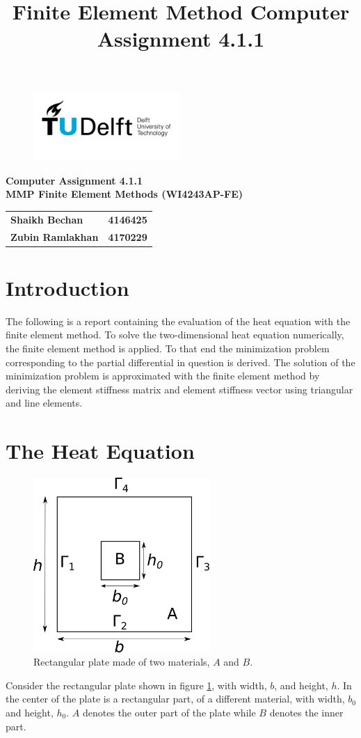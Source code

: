 \documentclass[10pt,a4paper]{article}
\title{Finite Element Method Computer Assignment 4.1.1}
\begin{document}
\begin{figure}[t]
	\centering
	\includegraphics[width=0.5\textwidth]{TU_d_line_P1_color_1.jpg}
\end{figure}

\begin{center}
	\textbf{Computer Assignment 4.1.1}\\
	\textbf{MMP Finite Element Methods (WI4243AP-FE)}
	\begin{tabular}{lr}
		\textbf{Shaikh Bechan} & \textbf{4146425}\\
		\textbf{Zubin Ramlakhan} & \textbf{4170229}\\
	\end{tabular}
\end{center}

\section{Introduction}
The following is a report containing the evaluation of the heat equation with the finite element method.
To solve the two-dimensional heat equation numerically, the finite element method is applied. To that end the minimization problem corresponding to the partial differential in question is derived. The solution of the minimization problem is approximated with the finite element method by deriving the element stiffness matrix and element stiffness vector using triangular and line elements.

\section{The Heat Equation}
	\begin{figure}[h]
		\centering
		\includegraphics[width=0.6\textwidth]{schem.png}
		\caption{Rectangular plate made of two materials, $A$ and $B$.}
		\label{fig:schem}
	\end{figure}
Consider the rectangular plate shown in figure \ref{fig:schem}, with width, $b$, and height, $h$. In the center of the plate is a rectangular part, of a different material, with width, $b_0$ and height, $h_0$. $A$ denotes the outer part of the plate while $B$ denotes the inner part.
\end{document}
